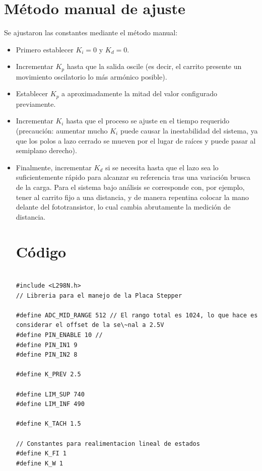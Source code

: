\documentclass{article}
\begin{document}
\section{Método manual de ajuste}
Se ajustaron las constantes mediante el método manual:
\begin{itemize}
  \item Primero establecer $K_i=0$ y $K_d=0$. 
  \item Incrementar $K_p$ hasta que la salida oscile (es decir, el carrito presente un movimiento oscilatorio lo más armónico posible).
  \item Establecer $K_p$ a aproximadamente la mitad del valor configurado previamente.
  \item Incrementar $K_i$ hasta que el proceso se ajuste en el tiempo requerido (precaución: aumentar mucho $K_i$ puede causar la inestabilidad del sistema, ya que los polos a lazo cerrado se mueven por el lugar de raíces y puede pasar al semiplano derecho).
  \item Finalmente, incrementar $K_d$ si se necesita hasta que el lazo sea lo suficientemente rápido para alcanzar su referencia tras una variación brusca de la carga. Para el sistema bajo análisis se corresponde con, por ejemplo, tener al carrito fijo a una distancia, y de manera repentina colocar la mano delante del fototransistor, lo cual cambia abrutamente la medición de distancia.

 
\newpage
\section{Código}
\begin{lstlisting}

#include <L298N.h>
// Libreria para el manejo de la Placa Stepper

#define ADC_MID_RANGE 512 // El rango total es 1024, lo que hace es considerar el offset de la se\~nal a 2.5V
#define PIN_ENABLE 10 // 
#define PIN_IN1 9
#define PIN_IN2 8

#define K_PREV 2.5

#define LIM_SUP 740
#define LIM_INF 490

#define K_TACH 1.5

// Constantes para realimentacion lineal de estados
#define K_FI 1
#define K_W 1


\end{lstlisting}
 
  
\end{itemize}
 
\end{document}
